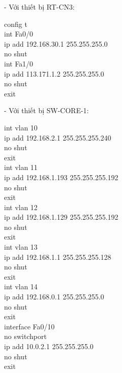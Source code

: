 \documentclass[12pt, a4paper]{article}
\begin{document}
\begin{flushleft}
		- Với thiết bị RT-CN3:
		\begin{tcolorbox}
			config t\\
			int Fa0/0\\
			ip add 192.168.30.1 255.255.255.0\\
			no shut\\
			int Fa1/0\\
			ip add 113.171.1.2 255.255.255.0\\
			no shut\\
			exit
		\end{tcolorbox}
		\newpage
		- Với thiết bị SW-CORE-1:
		\begin{tcolorbox}
			int vlan 10\\
			ip add 192.168.2.1 255.255.255.240\\
			no shut\\
			exit\\
			int vlan 11\\
			ip add 192.168.1.193 255.255.255.192\\
			no shut\\
			exit\\
			int vlan 12\\
			ip add 192.168.1.129 255.255.255.192\\
			no shut\\
			exit\\
			int vlan 13\\
			ip add 192.168.1.1 255.255.255.128\\
			no shut\\
			exit\\
			int vlan 14\\
			ip add 192.168.0.1 255.255.255.0\\
			no shut\\
			exit\\
			interface Fa0/10\\
			no switchport\\
			ip add 10.0.2.1 255.255.255.0\\
			no shut\\
			exit
		\end{tcolorbox}
		

\end{flushleft}
\end{document}
